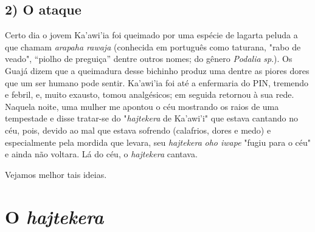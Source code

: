 \subsection{2) O ataque}

Certo dia o jovem Ka'awi'ia foi queimado por uma espécie de lagarta
peluda a que chamam \emph{arapaha rawaja} (conhecida em português como
taturana, "rabo de veado", ``piolho de preguiça'' dentre outros nomes;
do gênero \emph{Podalia} \emph{sp}.). Os Guajá dizem que a queimadura
desse bichinho produz uma dentre as piores dores que um ser humano pode
sentir. Ka'awi'ia foi até a enfermaria do PIN, tremendo e febril, e,
muito exausto, tomou analgésicos; em seguida retornou à sua rede.
Naquela noite, uma mulher me apontou o céu mostrando os raios de uma
tempestade e disse tratar-se do "\emph{hajtekera} de Ka'awi'i" que
estava cantando no céu, pois, devido ao mal que estava sofrendo
(calafrios, dores e medo) e especialmente pela mordida que levara, seu
\emph{hajtekera} \emph{oho iwape} "fugiu para o céu" e ainda não
voltara. Lá do céu, o \emph{hajtekera} cantava.

Vejamos melhor tais ideias.

\section{O \emph{hajtekera}}\label{o-hajtekera}

